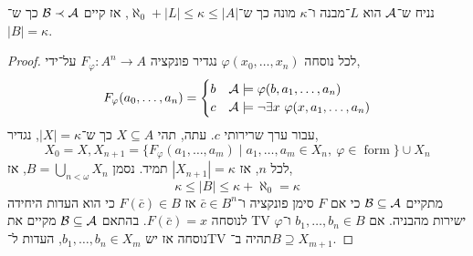 \begin{corollary}
	נניח ש־$\mathcal{A}$ הוא $L$־מבנה ו־$\kappa$ מונה כך ש־$\aleph_0 + |L| \le \kappa \le |A|$, אז קיים $\mathcal{B} \prec \mathcal{A}$ כך ש־$|B| = \kappa$.
\end{corollary}
\begin{proof}
	לכל נוסחה $\varphi(x_0, \ldots, x_n)$ נגדיר פונקציה $F_{\varphi} : A^n \to A$ על־ידי,
	\[
		F_{\varphi}(a_0, \ldots, a_n)
		= \begin{cases}
			b & \mathcal{A} \models \varphi(b, a_1, \ldots, a_n) \\
			c & \mathcal{A} \models \lnot \exists x\ \varphi(x, a_1, \ldots, a_n)
		\end{cases}
	\]
	עבור ערך שרירותי $c$.
	עתה, תהי $X \subseteq A$ כך ש־$|X| = \kappa$, נגדיר,
	\[
		X_0 = X,
		X_{n + 1} = \{ F_{\varphi}(a_1, \ldots, a_m) \mid a_1, \ldots, a_m \in X_n,\ \varphi \in \operatorname{form} \} \cup X_n
	\]
	לכל $n$, אז $|X_{n + 1}| = \kappa$ תמיד.
	נסמן $B = \bigcup_{n < \omega} X_n$, אז,
	\[
		\kappa \le |B| \le \kappa + \aleph_0 = \kappa
	\]
	מתקיים $\mathcal{B} \subseteq \mathcal{A}$ כי אם $F$ סימן פונקציה ו־$\bar{c} \in B^n$ אז $F(\bar{c}) \in B$ כי הוא העדות היחידה לנוסחה $F(\bar{c}) = x$.
	בהתאם $\mathcal{B} \subseteq \mathcal{A}$ מקיים את TV ישירות מהבניה.
	אם $b_1, \ldots, b_n \in B$ ו־$\varphi$ נוסחה אז יש $b_1, \ldots, b_n \in X_m$, העדות ל־TV תהיה ב־$B \supseteq X_{m + 1}$.
\end{proof}

\listoftheorems[title=הגדרות ומשפטים,ignoreall,show={theorem,definition},swapnumber,onlynamed={proposition,lemma}]


